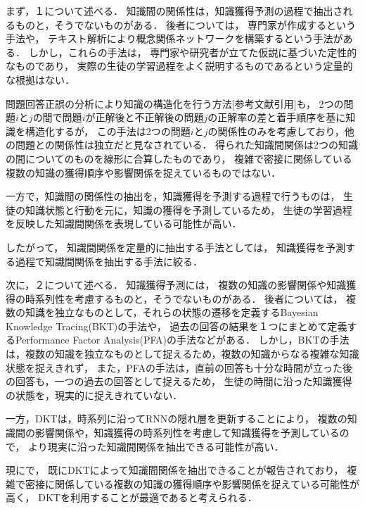 まず，１について述べる．
知識間の関係性は，知識獲得予測の過程で抽出されるものと，そうでないものがある．
後者については，
専門家が作成するという手法や，
テキスト解析により概念関係ネットワークを構築するという手法\cite{chen2008mining}がある．
しかし，これらの手法は，
専門家や研究者が立てた仮説に基づいた定性的なものであり，
実際の生徒の学習過程をよく説明するものであるという定量的な根拠はない．

問題回答正誤の分析により知識の構造化を行う方法[参考文献引用]も，%
2つの問題$i$と$j$の間で問題$i$が正解後と不正解後の問題$j$の正解率の差と着手順序を基に知識を構造化するが，
この手法は2つの問題$i$と$j$の関係性のみを考慮しており，他の問題との関係性は独立だと見なされている．
得られた知識間関係は2つの知識の間についてのものを線形に合算したものであり，
複雑で密接に関係している複数の知識の獲得順序や影響関係を捉えているものではない．

一方で，知識間の関係性の抽出を，知識獲得を予測する過程で行うものは，
生徒の知識状態と行動を元に，知識の獲得を予測しているため，
生徒の学習過程を反映した知識間関係を表現している可能性が高い．

したがって，
知識間関係を定量的に抽出する手法としては，
知識獲得を予測する過程で知識間関係を抽出する手法に絞る．


次に，２について述べる．
知識獲得予測には，
複数の知識の影響関係や知識獲得の時系列性を考慮するものと，そうでないものがある．
後者については，
複数の知識を独立なものとして，それらの状態の遷移を定義するBayesian Knowledge Tracing(BKT)の手法や，
過去の回答の結果を１つにまとめて定義するPerformance Factor Analysis(PFA)の手法などがある．
しかし，BKTの手法は，複数の知識を独立なものとして捉えるため，複数の知識からなる複雑な知識状態を捉えきれず，
また，PFAの手法は，直前の回答も十分な時間が立った後の回答も，一つの過去の回答として捉えるため，
生徒の時間に沿った知識獲得の状態を，現実的に捉えきれていない．

一方，DKTは，時系列に沿ってRNNの隠れ層を更新することにより，
複数の知識間の影響関係や，知識獲得の時系列性を考慮して知識獲得を予測しているので，
より現実に沿った知識間関係を抽出できる可能性が高い．

現に\cite{piech2015deep}で，
既にDKTによって知識間関係を抽出できることが報告されており，
複雑で密接に関係している複数の知識の獲得順序や影響関係を捉えている可能性が高く，
DKTを利用することが最適であると考えられる．

